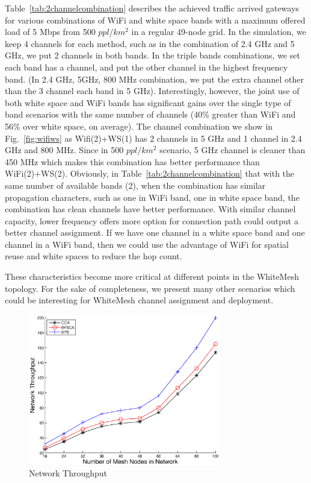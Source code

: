 Table~\ref{tab:2channelcombination} describes the achieved traffic arrived gateways for various
combinations of WiFi and white space bands with a maximum offered load of 5 Mbps from 500 $ppl/km^2$ in
a regular 49-node grid. 
In the simulation, we keep 4 channels for each method, such as in the combination of
2.4 GHz and 5 GHz, we put 2 channels in both bands. In the triple bands combinations,
we set each band has a channel, and put the other channel in the highest frequency band.
(In 2.4 GHz, 5GHz, 800 MHz combination, we put the extra channel other than the 3 channel each 
band in 5 GHz). 
Interestingly, however, the joint use of both white space and WiFi
bands has significant gains over the single type of band scenarios with the same number 
of channels (40\% greater than WiFi and 56\% over white space, on average).  
The channel combination we show in Fig.~\ref{fig:wifiws} as Wifi(2)+WS(1) has
2 channels in 5 GHz and 1 channel in 2.4 GHz and 800 MHz. Since in 500 $ppl/km^2$ scenario,
5 GHz channel is cleaner than 450 MHz which makes this combination has better performance than
WiFi(2)+WS(2).  Obviously, in Table~\ref{tab:2channelcombination} that 
with the same number of available bands (2), when the combination has similar propagation
characters, such as one in WiFi band, one in white space band, the combination has 
clean channels have better performance. With similar channel capacity, lower frequency
offers more option for connection path could output a better channel assignment.   
If we have one channel in a white space band and one 
channel in a WiFi band, then we could use the advantage of WiFi for spatial reuse
and white spaces to reduce the hop count. 

These characteristics become more critical at
different points in the WhiteMesh topology. For the sake of completeness, we present
many other scenarios which could be interesting for WhiteMesh channel assignment
and deployment.





\begin{figure}
\vspace{-0.0in}
\centering
\includegraphics[width=84mm]{figures/network_throughput}
\vspace{-0.1in}
\caption{Network Throughput}
\label{fig:networktpt}
\vspace{-0.2in}
\end{figure}

